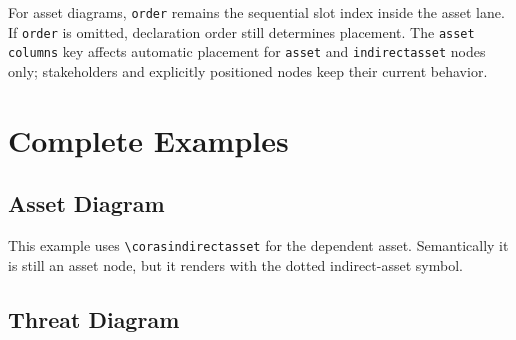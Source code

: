 \documentclass[a4paper]{article}
\begin{document}
For asset diagrams, \texttt{order} remains the sequential slot index inside the
asset lane. If \texttt{order} is omitted, declaration order still determines
placement. The \texttt{asset columns} key affects automatic placement for
\texttt{asset} and \texttt{indirectasset} nodes only; stakeholders and
explicitly positioned nodes keep their current behavior.

\section{Complete Examples}

\subsection{Asset Diagram}

This example uses \texttt{\textbackslash corasindirectasset} for the dependent
asset. Semantically it is still an asset node, but it renders with the dotted
indirect-asset symbol.

\begin{center}
\begin{corasassetdiagram}[x=.8cm,y=.8cm,asset columns=3]
  \corasstakeholder[
    name=doc-stakeholder,
    scope=doc-asset-scope,
    order=1,
    title={Stakeholder}
  ]
  \corasasset[
    name=doc-asset,
    scope=doc-asset-scope,
    order=1,
    title={Asset}
  ]
  \corasindirectasset[
    name=doc-indirect,
    scope=doc-asset-scope,
    order=2,
    title={Indirect\\Asset}
  ]
  \corasasset[
    name=doc-support,
    scope=doc-asset-scope,
    order=3,
    title={Supporting\\Asset}
  ]
  \corasscope[
    name=doc-asset-box,
    scope=doc-asset-scope,
    kind=asset-scope,
    stakeholder=doc-stakeholder,
    stakeholder corner=left
  ]
  \corasrelates[from=doc-asset,to=doc-indirect]
  \corasrelates[from=doc-support,to=doc-asset]
\end{corasassetdiagram}
\end{center}

\subsection{Threat Diagram}
\end{document}
